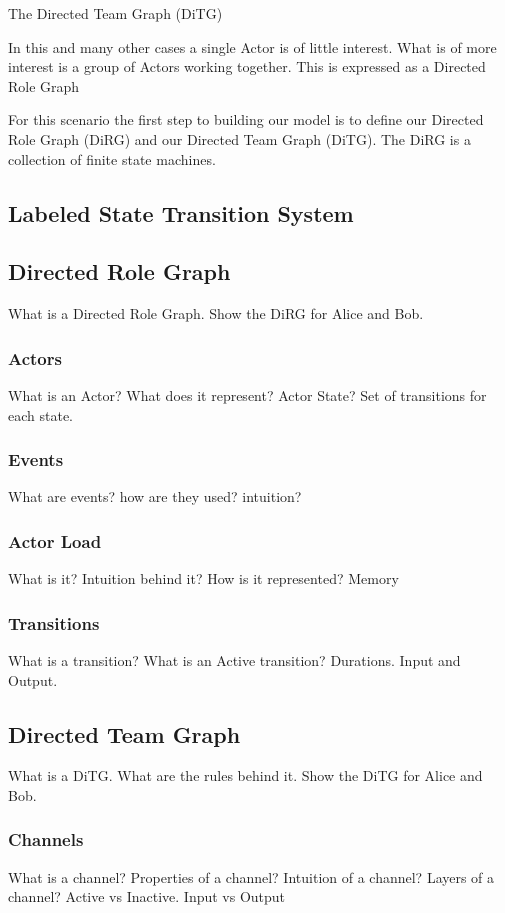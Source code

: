 The Directed Team Graph (DiTG) 


In this and many other cases a single Actor is of little interest.  What is of more interest is a group of Actors working together.  This is expressed as a Directed Role Graph

For this scenario the first step to building our model is to define our Directed Role Graph (DiRG) and our Directed Team Graph (DiTG).  The DiRG is a collection of finite state machines.



\subsection{Labeled State Transition System}


\subsection{Directed Role Graph}
What is a Directed Role Graph.  Show the DiRG for Alice and Bob.
\subsubsection{Actors}
What is an Actor?  What does it represent?  Actor State?  Set of transitions for each state.  

\subsubsection{Events}
What are events? how are they used? intuition?

\subsubsection{Actor Load}
What is it? Intuition behind it?  How is it represented? Memory

\subsubsection{Transitions}
What is a transition?  What is an Active transition? Durations.  Input and Output.

\subsection{Directed Team Graph}
What is a DiTG.  What are the rules behind it.  Show the DiTG for Alice and Bob.

\subsubsection{Channels}
What is a channel?  Properties of a channel?  Intuition of a channel?  Layers of a channel?  Active vs Inactive.  Input vs Output

